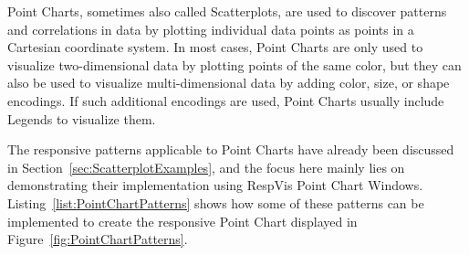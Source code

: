 Point Charts, sometimes also called Scatterplots, are used to discover
patterns and correlations in data by plotting individual data points
as points in a Cartesian coordinate system.  In most cases, Point
Charts are only used to visualize two-dimensional data by plotting
points of the same color, but they can also be used to visualize
multi-dimensional data by adding color, size, or shape encodings.  If
such additional encodings are used, Point Charts usually include
Legends to visualize them.

The responsive patterns applicable to Point Charts have already been
discussed in Section~\ref{sec:ScatterplotExamples}, and the focus here
mainly lies on demonstrating their implementation using RespVis Point
Chart Windows.  Listing~\ref{list:PointChartPatterns} shows how some
of these patterns can be implemented to create the responsive Point
Chart displayed in Figure~\ref{fig:PointChartPatterns}.

